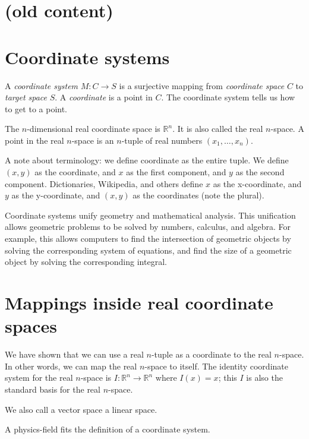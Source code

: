 \section{(old content)}

\section{Coordinate systems}

A \emph{coordinate system} $M : C \to S$ is a surjective mapping from
\emph{coordinate space} $C$ to \emph{target space} $S$.
A \emph{coordinate} is a point in \(C\).
The coordinate system tells us how to get to a point.

The \(n\)-dimensional real coordinate space is $\mathbb{R}^n$.
It is also called the real $n$-space.
A point in the real $n$-space is an $n$-tuple of real numbers $(x_1,\ldots,x_n)$.

A note about terminology:
we define coordinate as the entire tuple.
We define $(x,y)$ as the coordinate, and $x$ as the first component, and $y$ as the second component.
Dictionaries, Wikipedia, and others define $x$ as the x-coordinate, and $y$ as the y-coordinate,
and $(x,y)$ as the coordinates (note the plural).

Coordinate systems unify geometry and
mathematical analysis.
This unification allows geometric problems to be solved by
numbers, calculus, and algebra.
For example, this allows computers to
find the intersection of geometric objects
by solving the corresponding system of equations,
and find the size of a geometric object by solving the corresponding integral.

\section{Mappings inside real coordinate spaces}

We have shown that we can use a real $n$-tuple as a coordinate to the real $n$-space.
In other words, we can map the real $n$-space to itself.
The identity coordinate system for the real $n$-space is
$I : \mathbb{R}^n \to \mathbb{R}^n$ where $I(x) = x$;
this $I$ is also the standard basis for the real $n$-space.

We also call a vector space a linear space.

A physics-field fits the definition of a coordinate system.

